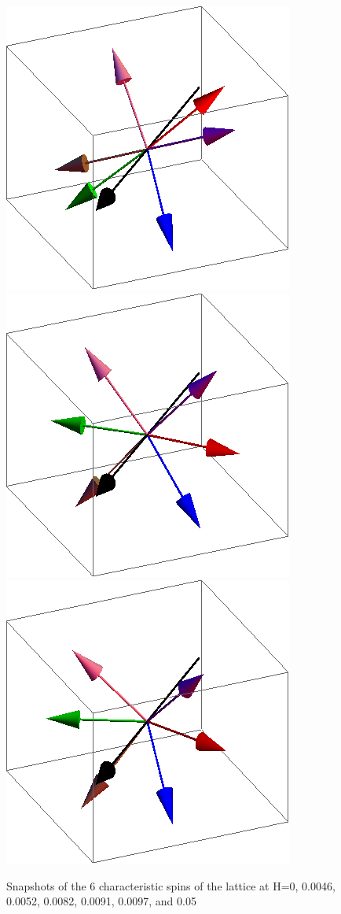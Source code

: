\documentclass{article}
\begin{document}
\begin{figure}[ht]
\includegraphics[scale=0.27]{110/86S000to005G.png}
\includegraphics[scale=0.27]{110/96S000to005G.png}
\includegraphics[scale=0.27]{110/501S000to005G.png}
\caption{Snapshots of the 6 characteristic spins of the lattice at H=0, 0.0046, 0.0052, 0.0082, 0.0091, 0.0097, and 0.05}
\end{figure}
\clearpage
\end{document}
